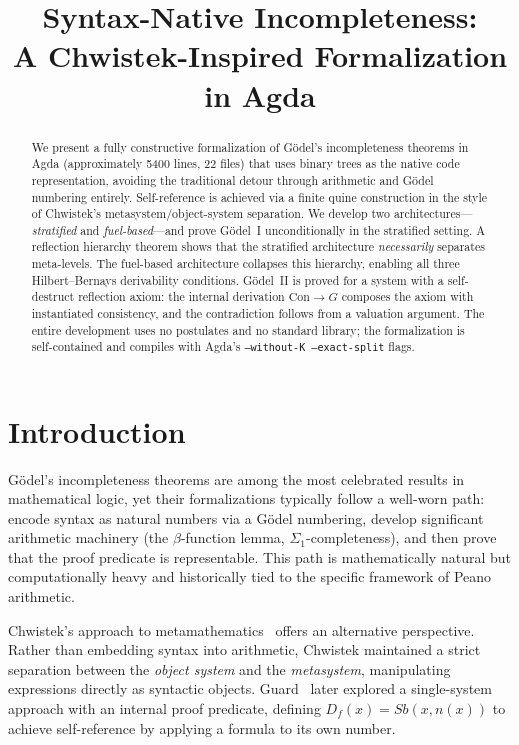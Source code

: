 \documentclass[11pt]{article}
\title{Syntax-Native Incompleteness:\\
  A Chwistek-Inspired Formalization in Agda}
\author{}
\date{}
\begin{document}
\maketitle

\begin{abstract}
We present a fully constructive formalization of G\"odel's incompleteness theorems
in Agda (approximately 5400 lines, 22 files) that uses binary trees as the native
code representation, avoiding the traditional detour through arithmetic and G\"odel
numbering entirely. Self-reference is achieved via a finite quine construction in
the style of Chwistek's metasystem/object-system separation. We develop two
architectures---\emph{stratified} and \emph{fuel-based}---and prove G\"odel~I
unconditionally in the stratified setting. A reflection hierarchy theorem shows
that the stratified architecture \emph{necessarily} separates meta-levels. The
fuel-based architecture collapses this hierarchy, enabling all three
Hilbert--Bernays derivability conditions. G\"odel~II is proved for a system with
a self-destruct reflection axiom: the internal derivation $\mathrm{Con} \to G$
composes the axiom with instantiated consistency, and the contradiction follows
from a valuation argument. The entire development uses no postulates and no
standard library; the formalization is self-contained and compiles with Agda's
\texttt{--without-K --exact-split} flags.
\end{abstract}

\section{Introduction}
\label{sec:intro}

G\"odel's incompleteness theorems are among the most celebrated results in
mathematical logic, yet their formalizations typically follow a well-worn path:
encode syntax as natural numbers via a G\"odel numbering, develop significant
arithmetic machinery (the $\beta$-function lemma, $\Sigma_1$-completeness),
and then prove that the proof predicate is representable. This path is
mathematically natural but computationally heavy and historically tied to
the specific framework of Peano arithmetic.

Chwistek's approach to metamathematics~\cite{Chwistek1939} offers an
alternative perspective. Rather than embedding syntax into arithmetic,
Chwistek maintained a strict separation between the \emph{object system}
and the \emph{metasystem}, manipulating expressions directly as syntactic
objects. Guard~\cite{Guard1969} later explored a single-system approach with
an internal proof predicate, defining $D_f(x) = Sb(x, n(x))$ to achieve
self-reference by applying a formula to its own number.
\end{document}
